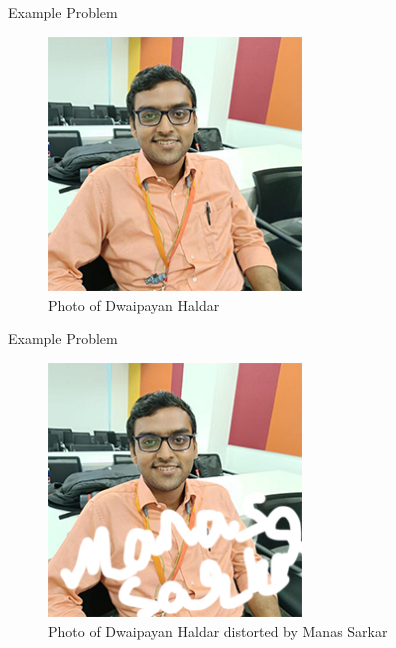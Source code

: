 \documentclass{beamer}
\begin{document}
\begin{frame}{Example Problem}
    \begin{figure}[h]
        \centering
        \includegraphics[width=0.6\textwidth]{Image.jpg} %
        \caption{Photo of Dwaipayan Haldar}
    \end{figure}
\end{frame}

\begin{frame}{Example Problem}
    \begin{figure}[h]
        \centering
        \includegraphics[width=0.6\textwidth]{Image_for_ts_gpt.png} %
        \caption{Photo of Dwaipayan Haldar distorted by Manas Sarkar}
    \end{figure}
\end{frame}
\end{document}
